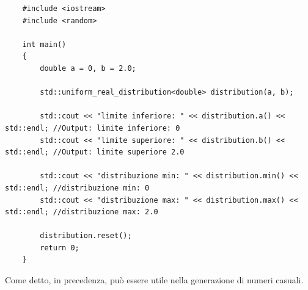 \begin{lstlisting}
	#include <iostream>
	#include <random>
	
	int main()
	{
		double a = 0, b = 2.0;
		
		std::uniform_real_distribution<double> distribution(a, b);
		
		std::cout << "limite inferiore: " << distribution.a() << std::endl; //Output: limite inferiore: 0
		std::cout << "limite superiore: " << distribution.b() << std::endl; //Output: limite superiore 2.0
		
		std::cout << "distribuzione min: " << distribution.min() << std::endl; //distribuzione min: 0
		std::cout << "distribuzione max: " << distribution.max() << std::endl; //distribuzione max: 2.0
		
		distribution.reset(); 
		return 0;
	}
\end{lstlisting}

\textsf{\small Come detto, in precedenza, può essere utile nella generazione di numeri casuali.} \\


